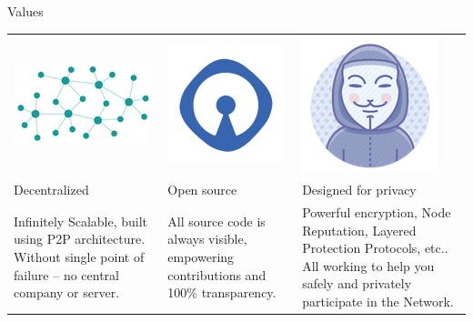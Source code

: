 \documentclass[10pt]{beamer}
\begin{document}
\begin{frame}[t]{Values}
\begin{tabularx} {\textwidth}{|Y|Y|Y|}
  \includegraphics[scale=0.3]{static/decentnew} & \includegraphics[scale=0.3]{static/opensource} & \includegraphics[scale=0.3]{static/privacy}\\  
Decentralized & Open source & Designed for privacy\\
Infinitely Scalable, built using P2P architecture. Without single point of failure – no central company or server.   &  All source code is always visible, empowering contributions and 100\% transparency. & Powerful encryption, Node Reputation, Layered Protection Protocols, etc.. All working to help you safely and privately participate in the Network.  \\

\end{tabularx}
\end{frame}
    
\end{document}
